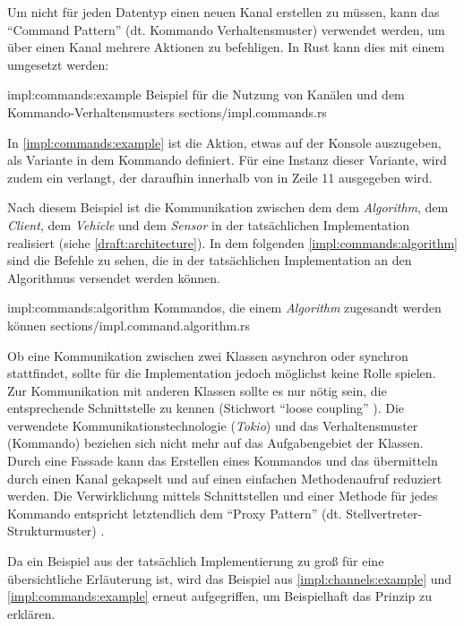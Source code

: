 Um nicht für jeden Datentyp einen neuen Kanal erstellen zu müssen, kann das \enquote{Command Pattern} (dt. Kommando Verhaltensmuster) \cite[153]{goll2014architektur} verwendet werden, um über einen Kanal mehrere Aktionen zu befehligen.
In Rust kann dies mit einem  umgesetzt werden:

\rustcinclude
	{impl:commands:example}
	{Beispiel für die Nutzung von Kanälen und dem Kommando-Verhaltensmusters}
	{sections/impl.commands.rs}
	
In \autoref{impl:commands:example} ist die Aktion, etwas auf der Konsole auszugeben, als Variante  in dem Kommando definiert.
Für eine Instanz dieser Variante, wird zudem ein  verlangt, der daraufhin innerhalb von  in Zeile 11 ausgegeben wird.

Nach diesem Beispiel ist die Kommunikation zwischen dem dem \textit{Algorithm}, dem \textit{Client}, dem \textit{Vehicle} und dem \textit{Sensor} in der tatsächlichen Implementation realisiert (siehe \autoref{draft:architecture}).
In dem folgenden \autoref{impl:commands:algorithm} sind die Befehle zu sehen, die in der tatsächlichen Implementation an den Algorithmus versendet werden können.

\rustcinclude
	{impl:commands:algorithm}
	{Kommandos, die einem \textit{Algorithm} zugesandt werden können}
	{sections/impl.command.algorithm.rs}

Ob eine Kommunikation zwischen zwei Klassen asynchron oder synchron stattfindet, sollte für die Implementation jedoch möglichst keine Rolle spielen.
Zur Kommunikation mit anderen Klassen sollte es nur nötig sein, die entsprechende Schnittstelle zu kennen (Stichwort \enquote{loose coupling} \cite[49]{goll2018entwurfsprinzipien}).
Die verwendete Kommunikationstechnologie (\textit{Tokio}) und das Verhaltensmuster (Kommando) beziehen sich nicht mehr auf das Aufgabengebiet der Klassen.
Durch eine Fassade kann das Erstellen eines Kommandos und das übermitteln durch einen Kanal gekapselt und auf einen einfachen Methodenaufruf reduziert werden.
Die Verwirklichung mittels Schnittstellen und einer Methode für jedes Kommando entspricht letztendlich dem \enquote{Proxy Pattern} (dt. Stellvertreter-Strukturmuster) \cite[137]{goll2018entwurfsprinzipien}.

Da ein Beispiel aus der tatsächlich Implementierung zu groß für eine übersichtliche Erläuterung ist, wird das Beispiel aus \autoref{impl:channels:example} und \autoref{impl:commands:example} erneut aufgegriffen, um Beispielhaft das Prinzip zu erklären.

